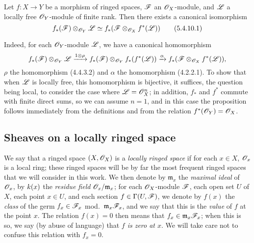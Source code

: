 \begin{env}[5.4.10]
\label{0.5.4.10}
Let $f:X\to Y$ be a morphism of ringed spaces, $\mathscr{F}$ an $\mathscr{O}_X$-module, and $\mathscr{L}$ a locally free $\mathscr{O}_Y$-module of finite rank.
Then there exists a canonical isomorphism
\[
  f_*(\mathscr{F})\otimes_{\mathscr{O}_Y}\mathscr{L}\simeq f_*(\mathscr{F}\otimes_{\mathscr{O}_X}f^*(\mathscr{L}))
  \tag{5.4.10.1}
\]

Indeed, for each $\mathscr{O}_Y$-module $\mathscr{L}$, we have a canonical homomorphism
\[
  f_*(\mathscr{F})\otimes_{\mathscr{O}_Y}\mathscr{L}\xrightarrow{1\otimes\rho}f_*(\mathscr{F})\otimes_{\mathscr{O}_Y}f_*(f^*(\mathscr{L}))\xrightarrow{\alpha}f_*(\mathscr{F}\otimes_{\mathscr{O}_X}f^*(\mathscr{L})),
\]
$\rho$ the homomorphism (4.4.3.2) and $\alpha$ the homomorphism (4.2.2.1).
To show that when $\mathscr{L}$ is locally free, this homomorphism is bijective, it suffices, the question being local, to consider the case where $\mathscr{L}=\mathscr{O}_X^n$;
in addition, $f_*$ and $f^*$ commute with finite direct sums, so we can assume $n=1$, and in this case the proposition follows immediately from the definitions and from the relation $f^*(\mathscr{O}_Y)=\mathscr{O}_X$.
\end{env}

\subsection{Sheaves on a locally ringed space}
\label{subsection:0.5.5}

\begin{env}[5.5.1]
\label{0.5.5.1}
We say that a ringed space $(X,\mathscr{O}_X)$ is a \emph{locally ringed space} if for each $x\in X$, $\mathscr{O}_x$ is a local ring;
these ringed spaces will be by far the most frequent ringed spaces that we will consider in this work.
We then denote by $\mathfrak{m}_x$ the \emph{maximal ideal} of $\mathscr{O}_x$, by $k(x)$ the \emph{residue field $\mathscr{O}_x/\mathfrak{m}_x$};
for each $\mathscr{O}_X$-module $\mathscr{F}$, each open set $U$ of $X$, each point $x\in U$, and each section $f\in\Gamma(U,\mathscr{F})$, we denote by $f(x)$ the \emph{class} of the germ $f_x\in\mathscr{F}_x$ mod.~$\mathfrak{m}_x\mathscr{F}_x$, and we say that this is the \emph{value} of $f$ at the point $x$.
The relation $f(x)=0$ then means that $f_x\in\mathfrak{m}_x\mathscr{F}_x$; when this is so, we say (by abuse of language) that \emph{$f$ is zero at $x$}.
We will take care not to confuse this relation with $f_x=0$.
\end{env}

